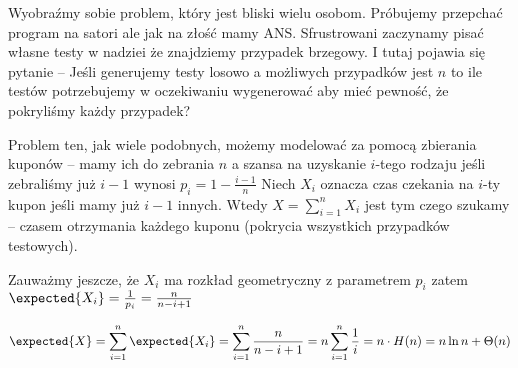 Wyobraźmy sobie problem, który jest bliski wielu osobom. Próbujemy przepchać program na satori ale jak na złość mamy ANS. Sfrustrowani zaczynamy pisać własne testy w nadziei że znajdziemy przypadek brzegowy.
I tutaj pojawia się pytanie -- Jeśli generujemy testy losowo a możliwych przypadków jest \( n \) to ile testów potrzebujemy w oczekiwaniu wygenerować aby mieć pewność, że pokryliśmy każdy przypadek?

Problem ten, jak wiele podobnych, możemy modelować za pomocą zbierania kuponów -- mamy ich do zebrania \( n \)
a szansa na uzyskanie \(i\)-tego rodzaju jeśli zebraliśmy już \( i - 1 \) wynosi \( p_i = 1 - \frac{i-1}{n} \) 
Niech \( X_i \) oznacza czas czekania na \(i\)-ty kupon jeśli mamy już \(i-1\) innych.
Wtedy \(X = \sum_{i=1}^n X_i\) jest tym czego szukamy -- czasem otrzymania każdego kuponu (pokrycia wszystkich przypadków testowych). 

Zauważmy jeszcze, że \( X_i \) ma rozkład geometryczny z parametrem \( p_i \) zatem \( \expected{X_i} = \frac{1}{p_i} = \frac{n}{n - i + 1} \)

\[
    \expected{X} = \sum_{i=1}^n \expected{X_i} = \sum_{i=1}^n \frac{n}{n-i+1} = n \sum_{i=1}^n \frac{1}{i}
    = n \cdot H(n) = n \ln n + \Theta(n)
\]